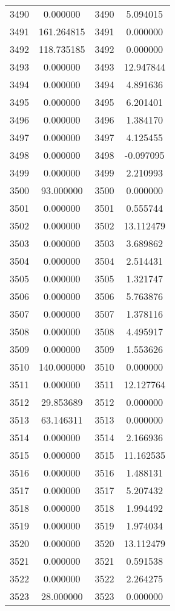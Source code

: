 \documentclass[12pt]{article}
\begin{document}
\begin{longtable}{@{}cccc@{}}
3490 & 0.000000 & 3490 & 5.094015 \\
3491 & 161.264815 & 3491 & 0.000000 \\
3492 & 118.735185 & 3492 & 0.000000 \\
3493 & 0.000000 & 3493 & 12.947844 \\
3494 & 0.000000 & 3494 & 4.891636 \\
3495 & 0.000000 & 3495 & 6.201401 \\
3496 & 0.000000 & 3496 & 1.384170 \\
3497 & 0.000000 & 3497 & 4.125455 \\
3498 & 0.000000 & 3498 & -0.097095 \\
3499 & 0.000000 & 3499 & 2.210993 \\
3500 & 93.000000 & 3500 & 0.000000 \\
3501 & 0.000000 & 3501 & 0.555744 \\
3502 & 0.000000 & 3502 & 13.112479 \\
3503 & 0.000000 & 3503 & 3.689862 \\
3504 & 0.000000 & 3504 & 2.514431 \\
3505 & 0.000000 & 3505 & 1.321747 \\
3506 & 0.000000 & 3506 & 5.763876 \\
3507 & 0.000000 & 3507 & 1.378116 \\
3508 & 0.000000 & 3508 & 4.495917 \\
3509 & 0.000000 & 3509 & 1.553626 \\
3510 & 140.000000 & 3510 & 0.000000 \\
3511 & 0.000000 & 3511 & 12.127764 \\
3512 & 29.853689 & 3512 & 0.000000 \\
3513 & 63.146311 & 3513 & 0.000000 \\
3514 & 0.000000 & 3514 & 2.166936 \\
3515 & 0.000000 & 3515 & 11.162535 \\
3516 & 0.000000 & 3516 & 1.488131 \\
3517 & 0.000000 & 3517 & 5.207432 \\
3518 & 0.000000 & 3518 & 1.994492 \\
3519 & 0.000000 & 3519 & 1.974034 \\
3520 & 0.000000 & 3520 & 13.112479 \\
3521 & 0.000000 & 3521 & 0.591538 \\
3522 & 0.000000 & 3522 & 2.264275 \\
3523 & 28.000000 & 3523 & 0.000000 \\

\end{longtable}
\end{document}
